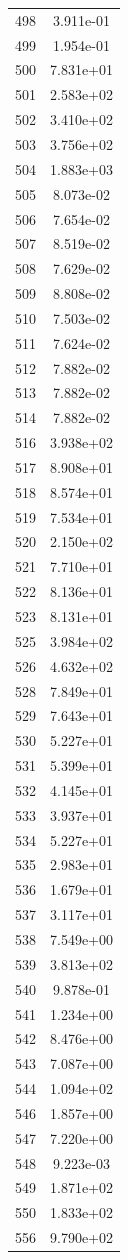 \documentclass[12pt]{article}
\begin{document}
\begin{longtable}{@{}cc@{}}
498 & 3.911e-01 \\
499 & 1.954e-01 \\
500 & 7.831e+01 \\
501 & 2.583e+02 \\
502 & 3.410e+02 \\
503 & 3.756e+02 \\
504 & 1.883e+03 \\
505 & 8.073e-02 \\
506 & 7.654e-02 \\
507 & 8.519e-02 \\
508 & 7.629e-02 \\
509 & 8.808e-02 \\
510 & 7.503e-02 \\
511 & 7.624e-02 \\
512 & 7.882e-02 \\
513 & 7.882e-02 \\
514 & 7.882e-02 \\
516 & 3.938e+02 \\
517 & 8.908e+01 \\
518 & 8.574e+01 \\
519 & 7.534e+01 \\
520 & 2.150e+02 \\
521 & 7.710e+01 \\
522 & 8.136e+01 \\
523 & 8.131e+01 \\
525 & 3.984e+02 \\
526 & 4.632e+02 \\
528 & 7.849e+01 \\
529 & 7.643e+01 \\
530 & 5.227e+01 \\
531 & 5.399e+01 \\
532 & 4.145e+01 \\
533 & 3.937e+01 \\
534 & 5.227e+01 \\
535 & 2.983e+01 \\
536 & 1.679e+01 \\
537 & 3.117e+01 \\
538 & 7.549e+00 \\
539 & 3.813e+02 \\
540 & 9.878e-01 \\
541 & 1.234e+00 \\
542 & 8.476e+00 \\
543 & 7.087e+00 \\
544 & 1.094e+02 \\
546 & 1.857e+00 \\
547 & 7.220e+00 \\
548 & 9.223e-03 \\
549 & 1.871e+02 \\
550 & 1.833e+02 \\
556 & 9.790e+02 \\

\bottomrule
\end{longtable}
\end{document}

